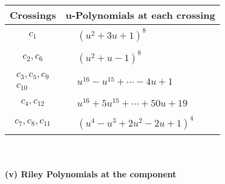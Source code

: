 \documentclass[1p]{elsarticle_modified}
\theoremstyle{definition}
\begin{document}
\begin{tabular}{m{50pt}|m{274pt}}
Crossings & \hspace{64pt}u-Polynomials at each crossing \\
\hline $$\begin{aligned}c_{1}\end{aligned}$$&$\begin{aligned}
&(u^2+3 u+1)^8
\end{aligned}$\\
\hline $$\begin{aligned}c_{2},c_{6}\end{aligned}$$&$\begin{aligned}
&(u^2+u-1)^8
\end{aligned}$\\
\hline $$\begin{aligned}c_{3},c_{5},c_{9}\\c_{10}\end{aligned}$$&$\begin{aligned}
&u^{16}- u^{15}+\cdots-4 u+1
\end{aligned}$\\
\hline $$\begin{aligned}c_{4},c_{12}\end{aligned}$$&$\begin{aligned}
&u^{16}+5 u^{15}+\cdots+50 u+19
\end{aligned}$\\
\hline $$\begin{aligned}c_{7},c_{8},c_{11}\end{aligned}$$&$\begin{aligned}
&(u^4- u^3+2 u^2-2 u+1)^4
\end{aligned}$\\
\hline
\end{tabular}\\~\\
\newpage\renewcommand{\arraystretch}{1}
\flushleft \textbf{(v) Riley Polynomials at the component}\newline \\
\end{document}
